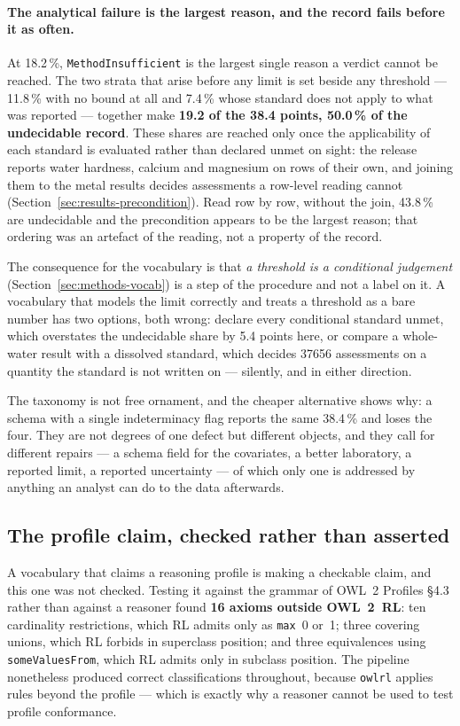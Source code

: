 \paragraph{The analytical failure is the largest reason, and the record
fails before it as often.} At \num{18.2}\,\%, \texttt{MethodInsufficient} is the largest
single reason a verdict cannot be reached. The two strata that arise before any
limit is set beside any threshold --- \num{11.8}\,\% with no bound at all and
\num{7.4}\,\% whose standard does not apply to what was reported --- together
make \textbf{\num{19.2} of the \num{38.4} points, \num{50.0}\,\% of the
undecidable record}. These shares are reached only once the applicability of
each standard is evaluated rather than declared unmet on sight: the release
reports water hardness, calcium and magnesium on rows of their own, and joining
them to the metal results decides assessments a row-level reading cannot
(Section~\ref{sec:results-precondition}). Read row by row, without the join,
\num{43.8}\,\% are undecidable and the precondition appears to be the largest
reason; that ordering was an artefact of the reading, not a property of the
record.

The consequence for the vocabulary is that \emph{a threshold is a conditional
judgement} (Section~\ref{sec:methods-vocab}) is a step of the procedure and not a
label on it. A vocabulary that models the limit correctly and treats a threshold
as a bare number has two options, both wrong: declare every conditional standard
unmet, which overstates the undecidable share by \num{5.4} points here, or
compare a whole-water result with a dissolved standard, which decides
\num{37656} assessments on a quantity the standard is not written on ---
silently, and in either direction.

The taxonomy is not free ornament, and the cheaper alternative shows why: a
schema with a single indeterminacy flag reports the same \num{38.4}\,\% and
loses the four. They are not degrees of one defect but different objects, and
they call for different repairs --- a schema field for the covariates, a better
laboratory, a reported limit, a reported uncertainty --- of which only one is
addressed by anything an analyst can do to the data afterwards.

\subsection{The profile claim, checked rather than asserted}
\label{sec:results-profile}
A vocabulary that claims a reasoning profile is making a checkable claim, and
this one was not checked. Testing it against the grammar of OWL~2 Profiles
\S4.3 rather than against a reasoner found
\textbf{\num{16} axioms outside OWL~2~RL}: ten cardinality restrictions, which
RL admits only as \texttt{max}~0 or~1; three covering unions, which RL forbids
in superclass position; and three equivalences using
\texttt{someValuesFrom}, which RL admits only in subclass position. The
pipeline nonetheless produced correct classifications throughout, because
\texttt{owlrl} applies rules beyond the profile --- which is exactly why a
reasoner cannot be used to test profile conformance.

